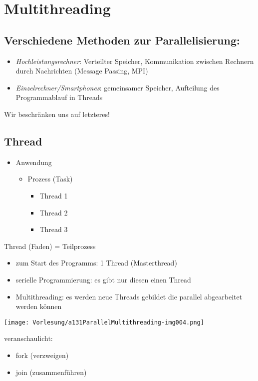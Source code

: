 \section{Multithreading}
\subsection{Verschiedene Methoden zur Parallelisierung:}

\begin{itemize}
\item \emph{Hochleistungsrechner}: Verteilter Speicher, Kommunikation zwischen Rechnern durch Nachrichten (Message Passing, MPI)
\item \emph{Einzelrechner/Smartphones}: gemeinsamer Speicher, Aufteilung des Programmablauf in Threads
\end{itemize}
Wir beschränken uns auf letzteres!

\subsection{Thread}
\begin{itemize}
\item Anwendung
\begin{itemize}
\item Prozess (Task)
\begin{itemize}
\item Thread 1
\item Thread 2
\item Thread 3
\end{itemize}
\end{itemize}
\end{itemize}
Thread (Faden) = Teilprozess
\begin{itemize}
\item zum Start des Programms: 1 Thread (Masterthread)
\item serielle Programmierung: es gibt nur diesen einen Thread
\item Multithreading: es werden neue Threads gebildet die parallel abgearbeitet werden können
\end{itemize}

\begin{center}
\texttt{[image: Vorlesung/a131ParallelMultithreading-img004.png]} 
\end{center}
veranschaulicht:
\begin{itemize}[label=$\to$]
\item fork (verzweigen)
\item join (zusammenführen)
\end{itemize}

